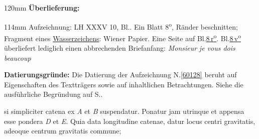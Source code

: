 %
\frenchspacing%
\begin{ledgroupsized}[r]{120mm}%
\footnotesize%
\pstart%
\noindent\textbf{Überlieferung:}%
\pend%
\end{ledgroupsized}%
\begin{ledgroupsized}[r]{114mm}%
\footnotesize%
\pstart%
\parindent -6mm%
%
Aufzeichnung:
LH XXXV 10, Bl..
Ein Blatt 8\textsuperscript{o},
Ränder beschnitten;
Fragment eines \href{\Scan{LH_35_10_16_008wz}}{Wasserzeichens}:
Wiener Papier.
Eine Seite auf Bl.\;\href{\Scan{LH_35_10_16_008r}}{8\,r\textsuperscript{o}}.
Bl.\;\href{\Scan{LH_35_10_16_008v}}{8\,v\textsuperscript{o}} überliefert lediglich einen abbrechenden Briefanfang: %
\textit{Monsieur} \bracks{/} \textit{je vous dois beaucoup}
\pend%
\end{ledgroupsized}%
\vspace{5mm}%
\begin{ledgroup}%
\footnotesize%
\pstart%
\noindent%
\textbf{Datierungsgründe:}
Die Datierung der Aufzeichnung N.\;\ref{60128} beruht auf Eigenschaften des Textträgers sowie auf inhaltlichen Betrachtungen.
Siehe die ausführliche Begründung auf S.\;\pageref{60128_dat}.%
\pend%
\end{ledgroup}%
%
\frenchspacing%
\vspace{8mm}%
\normalsize%
\pstart%
\noindent%
si simpliciter catena%
ex \textit{A} et \textit{B} suspendatur.%
Ponatur jam utrinque
et appensa esse pondera \textit{D} et \textit{E}.%
Quia data longitudine catenae,
datur locus%
centri gravitatis,%
adeoque centrum gravitatis commune;%
